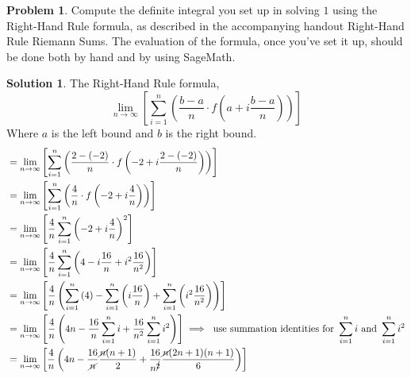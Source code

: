 \documentclass[10pt]{article}
\theoremstyle{definition}
\newtheorem{problem}{Problem}
\newtheorem{soln}{Solution}
\begin{document}
\begin{problem}
Compute the definite integral you set up in solving $1$ using the Right-Hand Rule formula, as
described in the accompanying handout Right-Hand Rule Riemann Sums. The evaluation of
the formula, once you've set it up, should be done both by hand and by using SageMath.
\end{problem}
\begin{soln}
    The Right-Hand Rule formula,
    \begin{equation}
        \lim_{n \to \infty}\left[\sum_{i = 1}^{n}\left( \frac{b-a}{n} \cdot f\left(a+i\frac{b-a}{n}\right) \right) \right]
    \end{equation}
    Where $a$ is the left bound and $b$ is the right bound.
    \begin{align*}
         & = \lim_{n \to \infty}\left[\sum_{i = 1}^{n}\left( \frac{2-(-2)}{n} \cdot f\left(-2+i\frac{2-(-2)}{n}\right) \right) \right]                                                                                                       \\
         & = \lim_{n \to \infty}\left[\sum_{i = 1}^{n}\left( \frac{4}{n} \cdot f\left(-2+i\frac{4}{n}\right) \right) \right]                                                                                                                 \\
         & = \lim_{n \to \infty}\left[\frac{4}{n}\sum_{i = 1}^{n}\left(-2+i\frac{4}{n}\right)^2 \right]                                                                                                                                      \\
         & = \lim_{n \to \infty}\left[\frac{4}{n}\sum_{i = 1}^{n}\left(4-i\frac{16}{n} + i^2\frac{16}{n^2}\right) \right]                                                                                                                    \\
         & = \lim_{n \to \infty}\left[\frac{4}{n}\left(\sum_{i = 1}^{n}\left(4\right)-\sum_{i = 1}^{n}\left(i\frac{16}{n}\right) + \sum_{i = 1}^{n}\left(i^2\frac{16}{n^2}\right)\right) \right]                                             \\
         & = \lim_{n \to \infty}\left[\frac{4}{n}\left(4n-\frac{16}{n}\sum_{i = 1}^{n}i + \frac{16}{n^2}\sum_{i = 1}^{n}i^2\right) \right] \implies \text{ use summation identities for } \sum_{i = 1}^{n}i \text{ and } \sum_{i = 1}^{n}i^2 \\
         & = \lim_{n \to \infty}\left[\frac{4}{n}\left(4n-\frac{16}{\cancel{n}}\frac{\cancel{n}(n+1)}{2} + \frac{16}{n^{\cancel{2}}}\frac{\cancel{n}(2n+1)(n+1)}{6}\right) \right]                                                           \\

\end{align*}
\end{soln}
\end{document}
